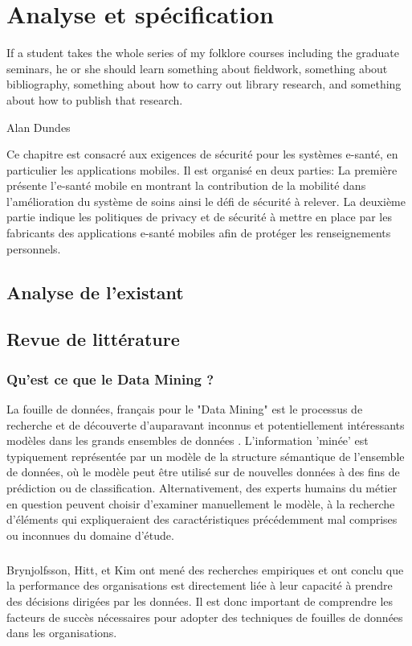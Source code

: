 \chapter{Analyse et spécification}
\epigraph{If a student takes the whole series of my folklore courses including the graduate seminars, he or she should learn something about fieldwork, something about bibliography, something about how to carry out library research, and something about how to publish that research.}{Alan Dundes}
Ce chapitre est consacré aux exigences de sécurité pour les systèmes e-santé, en particulier les applications mobiles. Il est organisé en deux parties: La première présente l'e-santé mobile en montrant la contribution de la mobilité dans l'amélioration du système de soins ainsi le défi de sécurité à relever. La deuxième partie indique les politiques de privacy et de sécurité à mettre en place par les fabricants des applications e-santé mobiles afin de protéger les renseignements personnels.
\cleardoublepage

\section{Analyse de l’existant}
\section{Revue de littérature}
\subsection{Qu'est ce que le Data Mining ?}
La fouille de données, français pour le "Data Mining" est le processus de recherche et de découverte d'auparavant inconnus et potentiellement intéressants modèles dans les grands ensembles de données \cite{def-DM}. L'information 'minée' est typiquement représentée par un modèle de la structure sémantique de l'ensemble de données, où le modèle peut être utilisé sur de nouvelles données à des fins de prédiction ou de classification. Alternativement, des experts humains du métier en question peuvent choisir d'examiner manuellement le modèle, à la recherche d'éléments qui expliqueraient des caractéristiques précédemment mal comprises ou inconnues du domaine d'étude.
\paragraph{}
Brynjolfsson, Hitt, et Kim\cite{data-driven-des} ont mené des recherches empiriques et ont conclu que la performance des organisations est directement liée à leur capacité à prendre des décisions dirigées par les données. Il est donc important de comprendre les facteurs de succès nécessaires pour adopter des techniques de fouilles de données dans les organisations.
